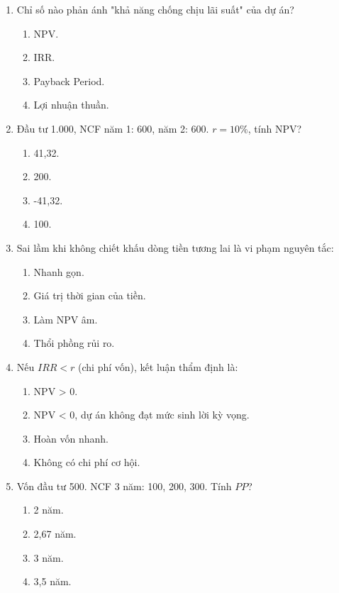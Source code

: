 \begin{enumerate}[label=\textbf{Câu \arabic*:}, leftmargin=*, resume]
\item Chỉ số nào phản ánh "khả năng chống chịu lãi suất" của dự án?
\begin{enumerate}[label=\Alph*.]
    \item NPV. \item IRR. \item Payback Period. \item Lợi nhuận thuần.
\end{enumerate}

\item Đầu tư 1.000, NCF năm 1: 600, năm 2: 600. $r=10\%$, tính NPV?
\begin{enumerate}[label=\Alph*.]
    \item 41,32. \item 200. \item -41,32. \item 100.
\end{enumerate}

\item Sai lầm khi không chiết khấu dòng tiền tương lai là vi phạm nguyên tắc:
\begin{enumerate}[label=\Alph*.]
    \item Nhanh gọn.
    \item Giá trị thời gian của tiền.
    \item Làm NPV âm.
    \item Thổi phồng rủi ro.
\end{enumerate}

\item Nếu $IRR < r$ (chi phí vốn), kết luận thẩm định là:
\begin{enumerate}[label=\Alph*.]
    \item NPV > 0.
    \item NPV < 0, dự án không đạt mức sinh lời kỳ vọng.
    \item Hoàn vốn nhanh.
    \item Không có chi phí cơ hội.
\end{enumerate}

\item Vốn đầu tư 500. NCF 3 năm: 100, 200, 300. Tính $PP$?
\begin{enumerate}[label=\Alph*.]
    \item 2 năm. \item 2,67 năm. \item 3 năm. \item 3,5 năm.
\end{enumerate}


\end{enumerate}
